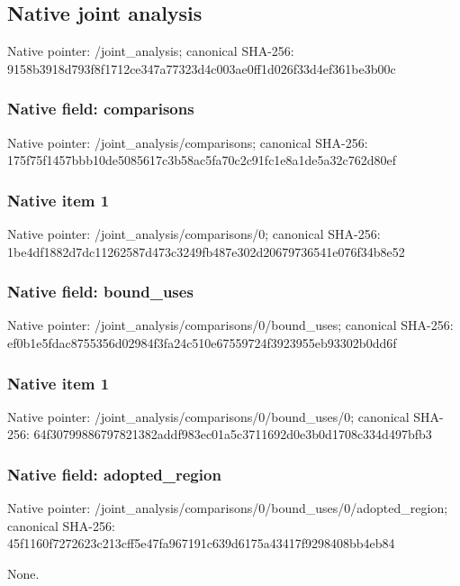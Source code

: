 \documentclass[10pt,a4paper]{article}
\begin{document}
\subsection{Native joint analysis}
Native pointer: /joint\_\allowbreak{}analysis; canonical SHA-256: 9158b3918d793f8f1712ce347a77323d4c003ae0ff1d026f33d4ef361be3b00c

\subsubsection{Native field: comparisons}
Native pointer: /joint\_\allowbreak{}analysis/comparisons; canonical SHA-256: 175f75f1457bbb10de5085617c3b58ac5fa70c2c91fc1e8a1de5a32c762d80ef

\subsubsection{Native item 1}
Native pointer: /joint\_\allowbreak{}analysis/comparisons/0; canonical SHA-256: 1be4df1882d7dc11262587d473c3249fb487e302d20679736541e076f34b8e52

\subsubsection{Native field: bound\_\allowbreak{}uses}
Native pointer: /joint\_\allowbreak{}analysis/comparisons/0/bound\_\allowbreak{}uses; canonical SHA-256: ef0b1e5fdac8755356d02984f3fa24c510e67559724f3923955eb93302b0dd6f

\subsubsection{Native item 1}
Native pointer: /joint\_\allowbreak{}analysis/comparisons/0/bound\_\allowbreak{}uses/0; canonical SHA-256: 64f30799886797821382addf983ec01a5c3711692d0e3b0d1708c334d497bfb3

\subsubsection{Native field: adopted\_\allowbreak{}region}
Native pointer: /joint\_\allowbreak{}analysis/comparisons/0/bound\_\allowbreak{}uses/0/adopted\_\allowbreak{}region; canonical SHA-256: 45f1160f7272623c213cff5e47fa967191c639d6175a43417f9298408bb4eb84

\begingroup\raggedright\sloppy None.\par\endgroup
\end{document}

